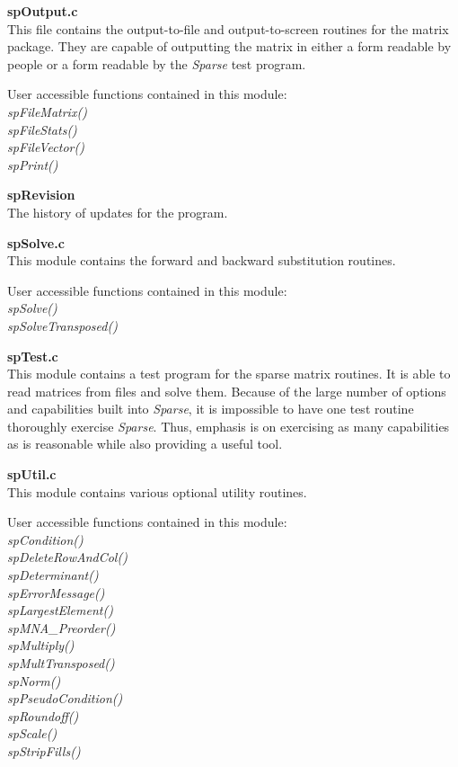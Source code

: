 \documentclass[11pt]{article}
\begin{document}
{\bf spOutput.c}\\
This file contains the output-to-file and output-to-screen routines for
the matrix package.  They are capable of outputting the matrix in either a
form readable by people or a form readable by the \emph{Sparse} test program.

User accessible functions contained in this module:\emph{\\
spFileMatrix()\\
spFileStats()\\
spFileVector()\\
spPrint()
}

{\bf spRevision}\\
The history of updates for the program.

{\bf spSolve.c}\\
This module contains the forward and backward substitution routines.

User accessible functions contained in this module:\emph{\\
spSolve()\\
spSolveTransposed()
}

{\bf spTest.c}\\
This module contains a test program for the sparse matrix routines.
It is able to read matrices from files and solve them.  Because of
the large number of options and capabilities built into \emph{Sparse},
it is impossible to have one test routine thoroughly exercise
\emph{Sparse}.  Thus, emphasis is on exercising as many capabilities as
is reasonable while also providing a useful tool.

{\bf spUtil.c}\\
This module contains various optional utility routines.

User accessible functions contained in this module:\emph{\\
spCondition()\\
spDeleteRowAndCol()\\
spDeterminant()\\
spErrorMessage()\\
spLargestElement()\\
spMNA\_Preorder()\\
spMultiply()\\
spMultTransposed()\\
spNorm()\\
spPseudoCondition()\\
spRoundoff()\\
spScale()\\
spStripFills()
}
\end{document}
